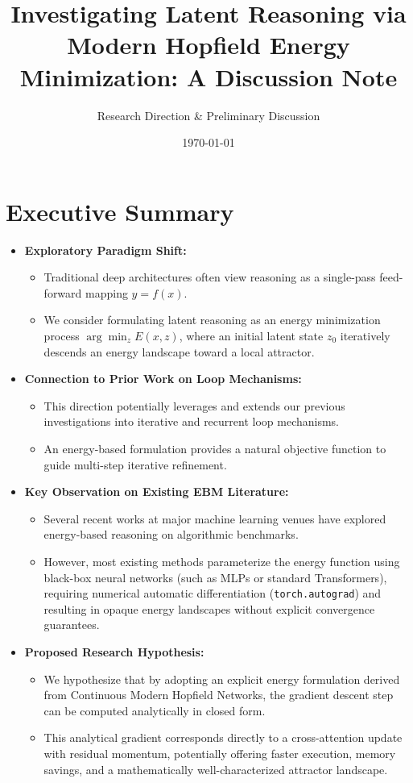 \documentclass[11pt,a4paper]{article}
\title{\textbf{Investigating Latent Reasoning via Modern Hopfield Energy Minimization: A Discussion Note}}
\author{Research Direction \& Preliminary Discussion}
\date{\today}
\begin{document}
\maketitle

\section*{Executive Summary}
\begin{itemize}[leftmargin=1.5em]
    \item \textbf{Exploratory Paradigm Shift:} 
    \begin{itemize}[leftmargin=1.2em]
        \item Traditional deep architectures often view reasoning as a single-pass feed-forward mapping $y = f(x)$.
        \item We consider formulating latent reasoning as an energy minimization process $\arg\min_z E(x, z)$, where an initial latent state $z_0$ iteratively descends an energy landscape toward a local attractor.
    \end{itemize}

    \item \textbf{Connection to Prior Work on Loop Mechanisms:}
    \begin{itemize}[leftmargin=1.2em]
        \item This direction potentially leverages and extends our previous investigations into iterative and recurrent loop mechanisms.
        \item An energy-based formulation provides a natural objective function to guide multi-step iterative refinement.
    \end{itemize}

    \item \textbf{Key Observation on Existing EBM Literature:}
    \begin{itemize}[leftmargin=1.2em]
        \item Several recent works at major machine learning venues have explored energy-based reasoning on algorithmic benchmarks.
        \item However, most existing methods parameterize the energy function using black-box neural networks (such as MLPs or standard Transformers), requiring numerical automatic differentiation (\texttt{torch.autograd}) and resulting in opaque energy landscapes without explicit convergence guarantees.
    \end{itemize}

    \item \textbf{Proposed Research Hypothesis:}
    \begin{itemize}[leftmargin=1.2em]
        \item We hypothesize that by adopting an explicit energy formulation derived from Continuous Modern Hopfield Networks, the gradient descent step can be computed analytically in closed form.
        \item This analytical gradient corresponds directly to a cross-attention update with residual momentum, potentially offering faster execution, memory savings, and a mathematically well-characterized attractor landscape.
    \end{itemize}
\end{itemize}
\end{document}
